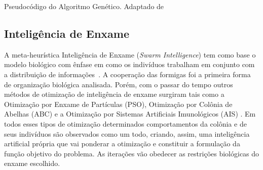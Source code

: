 \begin{algorithm}[ht]
    \label{algGenetico}
    \SetAlgoLined
    \caption{Pseudocódigo do Algoritmo Genético. Adaptado de }
\end{algorithm}


\subsection{Inteligência de Enxame}

A meta-heurística Inteligência de Enxame (\textit{Swarm Intelligence}) tem como base o modelo biológico com ênfase em como os indivíduos trabalham em conjunto com a distribuição de informações~\cite{blum2008swarm}. A cooperação das formigas foi a primeira forma de organização biológica analisada. Porém, com o passar do tempo  outros métodos de otimização de inteligência de enxame surgiram tais como a Otimização por Enxame de Partículas (PSO), Otimização por Colônia de Abelhas (ABC) e a Otimização por Sistemas Artificiais Imunológicos (AIS) \cite{blum2008swarm}. Em todos esses tipos de otimização determinados comportamentos da colônia e de seus indivíduos são observados como um todo, criando, assim, uma inteligência artificial própria que vai ponderar a otimização e constituir a formulação da função objetivo do problema. As iterações vão obedecer as restrições biológicas do enxame escolhido.

